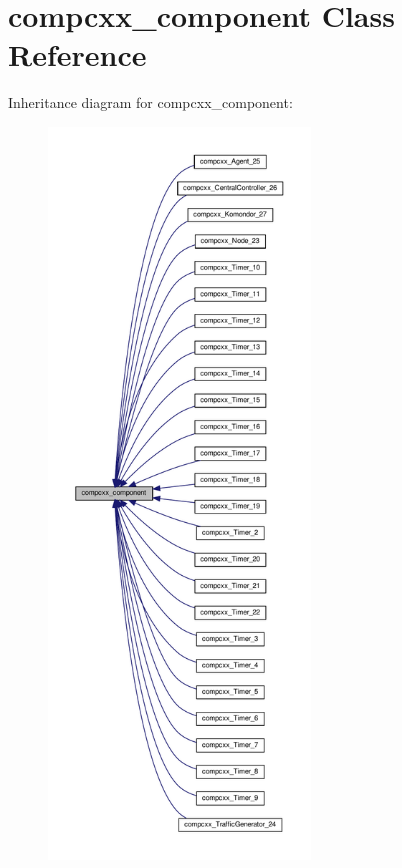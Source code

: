 \hypertarget{classcompcxx__component}{}\section{compcxx\+\_\+component Class Reference}
\label{classcompcxx__component}


Inheritance diagram for compcxx\+\_\+component\+:\nopagebreak
\begin{figure}[H]
\begin{center}
\leavevmode
\includegraphics[height=550pt]{classcompcxx__component__inherit__graph}
\end{center}
\end{figure}
